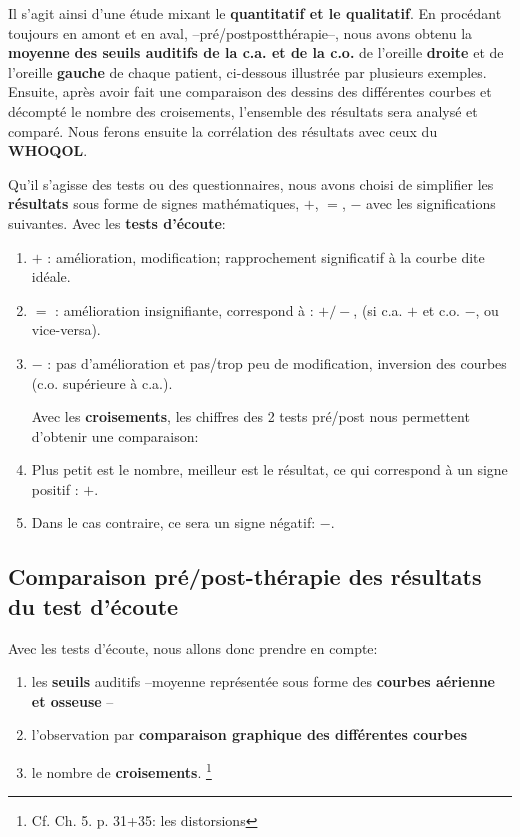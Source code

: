 Il s'agit ainsi d'une étude mixant le \textbf{quantitatif  et le
  qualitatif}.
En procédant toujours en amont et en aval, --pré/postpostthérapie--, nous
avons obtenu la \textbf{moyenne} \textbf{des seuils
auditifs de la c.a. et de la c.o.} de l'oreille \textbf{droite} et de
l'oreille \textbf{gauche} de chaque patient, ci-dessous illustrée par
plusieurs exemples. Ensuite, après avoir 
fait une comparaison des dessins des différentes courbes et
décompté le nombre des croisements, l'ensemble des résultats sera analysé et comparé.
Nous ferons ensuite la corrélation des résultats avec ceux du\textbf{
  WHOQOL}.

Qu'il s'agisse des tests ou des questionnaires, nous avons choisi de
simplifier les \textbf{résultats} sous forme de signes
mathématiques, $+$, $=$, $-$ avec les significations suivantes.
Avec les \textbf{tests d'écoute}: 
\begin{enumerate}
\item$+$   : amélioration, modification;  rapprochement significatif à la courbe dite idéale.
\item$=$   : amélioration insignifiante, correspond à : $+/-$, (si c.a. $ + $ et c.o. $-$, ou vice-versa).

\item$-$   : pas d'amélioration et pas/trop peu  de modification, inversion
des courbes (c.o. supérieure à c.a.). 

  Avec les \textbf{croisements}, les chiffres des 2 tests pré/post
  nous permettent d'obtenir une comparaison: 
  \item Plus petit est le nombre, meilleur est le résultat, ce qui correspond à un signe positif : $+$.
\item Dans le
  cas contraire, ce sera un signe négatif: $-$.
  
\end{enumerate}


 \subsection{ Comparaison pré/post-thérapie des résultats du test d'écoute}
Avec les tests d'écoute, nous 
allons donc prendre en compte:

\begin{enumerate}
 \item   les \textbf{seuils} auditifs --moyenne
représentée sous forme des \textbf{courbes aérienne et osseuse} --
\item  l'observation par \textbf{comparaison graphique des différentes
  courbes}
\item le nombre de
\textbf{croisements}. \footnote{Cf. Ch. 5. p. 31+35: les distorsions}
 
\end{enumerate}


